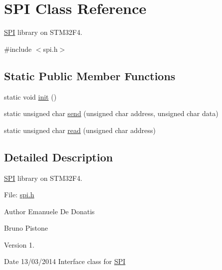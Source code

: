 \hypertarget{class_s_p_i}{\section{S\-P\-I Class Reference}
\label{class_s_p_i}
}


\hyperlink{class_s_p_i}{S\-P\-I} library on S\-T\-M32\-F4.  




{\ttfamily \#include $<$spi.\-h$>$}

\subsection*{Static Public Member Functions}
\begin{DoxyCompactItemize}
\item 
static void \hyperlink{class_s_p_i_a60cff52f775b82a444dcab1424ae7559}{init} ()
\item 
static unsigned char \hyperlink{class_s_p_i_ada5e442f8af2589e665cf9fc5ca2ea3b}{send} (unsigned char address, unsigned char data)
\item 
static unsigned char \hyperlink{class_s_p_i_a30fa5b93728ebc46a2b4b2a3f87e6c02}{read} (unsigned char address)
\end{DoxyCompactItemize}


\subsection{Detailed Description}
\hyperlink{class_s_p_i}{S\-P\-I} library on S\-T\-M32\-F4. 

File\-: \hyperlink{spi_8h_source}{spi.\-h} \begin{DoxyAuthor}{Author}
Emanuele De Donatis 

Bruno Pistone 
\end{DoxyAuthor}
\begin{DoxyVersion}{Version}
1. 
\end{DoxyVersion}
\begin{DoxyDate}{Date}
13/03/2014 Interface class for \hyperlink{class_s_p_i}{S\-P\-I} 
\end{DoxyDate}


